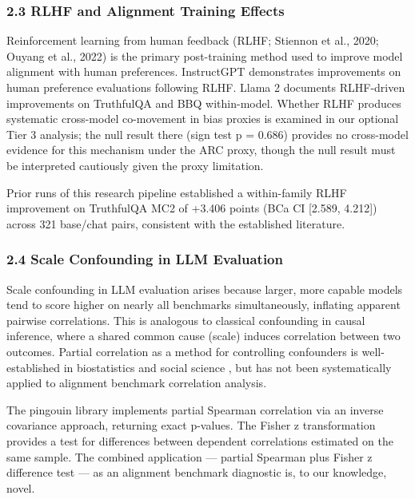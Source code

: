 \subsubsection{2.3 RLHF and Alignment Training Effects}

Reinforcement learning from human feedback (RLHF; Stiennon et al., 2020; Ouyang et al., 2022) is the primary post-training method used to improve model alignment with human preferences. InstructGPT \citep{Ouyang2022} demonstrates improvements on human preference evaluations following RLHF. Llama 2 \citep{Touvron2023} documents RLHF-driven improvements on TruthfulQA and BBQ within-model. Whether RLHF produces systematic cross-model co-movement in bias proxies is examined in our optional Tier 3 analysis; the null result there (sign test p = 0.686) provides no cross-model evidence for this mechanism under the ARC proxy, though the null result must be interpreted cautiously given the proxy limitation.

Prior runs of this research pipeline established a within-family RLHF improvement on TruthfulQA MC2 of +3.406 points (BCa CI [2.589, 4.212]) across 321 base/chat pairs, consistent with the established literature.

\subsubsection{2.4 Scale Confounding in LLM Evaluation}

Scale confounding in LLM evaluation arises because larger, more capable models tend to score higher on nearly all benchmarks simultaneously, inflating apparent pairwise correlations. This is analogous to classical confounding in causal inference, where a shared common cause (scale) induces correlation between two outcomes. Partial correlation as a method for controlling confounders is well-established in biostatistics and social science \citep{Liu2017}, but has not been systematically applied to alignment benchmark correlation analysis.

The pingouin library \citep{Vallat2018Pingouin} implements partial Spearman correlation via an inverse covariance approach, returning exact p-values. The Fisher z transformation \citep{Fisher1915Frequency} provides a test for differences between dependent correlations estimated on the same sample. The combined application --- partial Spearman plus Fisher z difference test --- as an alignment benchmark diagnostic is, to our knowledge, novel.

